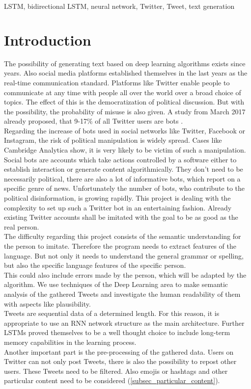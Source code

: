 \documentclass[conference]{IEEEtran}
\begin{document}
\begin{IEEEkeywords}
LSTM, bidirectional LSTM, neural network, Twitter, Tweet, text generation
\end{IEEEkeywords}

\section{Introduction}

The possibility of generating text based on deep learning algorithms exists since years. Also social media platforms established themselves in the last years as the real-time communication standard. Platforms like Twitter enable people to communicate at any time with people all over the world over a broad choice of topics. The effect of this is the democratization of political discussion. But with the possibility, the probability of misuse is also given. A study from March 2017 already proposed, that 9-17\% of all Twitter users are bots \cite{tim1}.\\
Regarding the increase of bots used in social networks like Twitter, Facebook or Instagram, the risk of political manipulation is widely spread. Cases like Cambridge Analytica show, it is very likely to be victim of such a manipulation.\\
Social bots are accounts which take actions controlled by a software either to establish interaction or generate content algorithmically. They don’t need to be necessarily political, there are also a lot of informative bots, which report on a specific genre of news. Unfortunately the number of bots, who contribute to the political disinformation, is growing rapidly. This project is dealing with the complexity to set up such a Twitter bot in an entertaining fashion. Already existing Twitter accounts shall be imitated with the goal to be as good as the real person.\\
The difficulty regarding this project consists of the semantic understanding for the person to imitate. Therefore the program needs to extract features of the language. But not only it needs to understand the general grammar or spelling, but also the specific language features of the specific person.\\
This could also include errors made by the person, which will be adapted by the algorithm. We use techniques of the Deep Learning area to make semantic analysis of the gathered Tweets and investigate the human readability of them with aspects like plausibility.\\
Tweets are sequential data of a determined length. For this reason, it is appropriate to use an RNN network structure as the main architecture. Further LSTMs proved themselves to be a well thought choice to include long-term memory capabilities in the learning process.\\
Another important part is the pre-processing of the gathered data. Users on Twitter can not only post Tweets, there is also the possibility to repost other users. These Tweets need to be filtered. Also emojis or hashtags and other particular content need to be considered (\ref{subsec_particular_content}).\\
\end{document}
